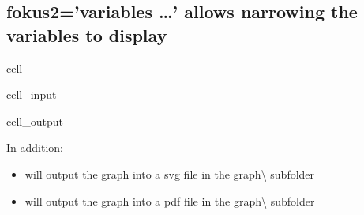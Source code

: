 \documentclass[letterpaper,10pt,english]{jupyterBook}
\begin{document}
\subsection{fokus2=’variables …’ allows narrowing the variables to display}
\label{\detokenize{content/06_ModelAnalytics/ModelStructure:fokus2-variables-allows-narrowing-the-variables-to-display}}
\begin{sphinxuseclass}{cell}\begin{sphinxVerbatimInput}

\begin{sphinxuseclass}{cell_input}
\begin{sphinxVerbatim}[commandchars=\\\{\}]
 
                                       
\end{sphinxVerbatim}

\end{sphinxuseclass}\end{sphinxVerbatimInput}
\begin{sphinxVerbatimOutput}

\begin{sphinxuseclass}{cell_output}
\noindent{}

\end{sphinxuseclass}\end{sphinxVerbatimOutput}

\end{sphinxuseclass}
\sphinxAtStartPar
In addition:
\begin{itemize}
\item {} 
\sphinxAtStartPar
{} will output the graph into a svg file in the graph\textbackslash{} subfolder

\item {} 
\sphinxAtStartPar
{} will output the graph into a pdf file in the graph\textbackslash{} subfolder

\end{itemize}
\end{document}
